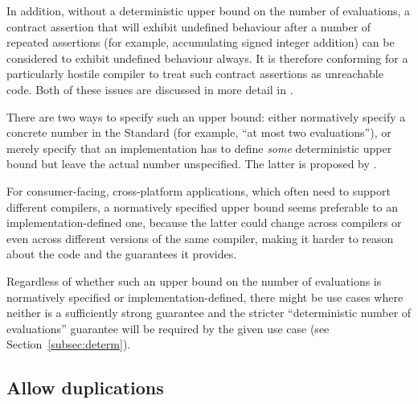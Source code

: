 In addition, without a deterministic upper bound on the number of evaluations, a contract assertion that will exhibit undefined behaviour after a number of repeated assertions (for example, accumulating signed integer addition) can be considered to exhibit undefined behaviour always. It is therefore conforming for a particularly hostile compiler to treat such contract assertions as unreachable code. Both of these issues are discussed in more detail in \cite{P3119R0}.

There are two ways to specify such an upper bound: either normatively specify a concrete number in the Standard (for example, ``at most two evaluations''), or merely specify that an implementation has to define \emph{some} deterministic upper bound but leave the actual number unspecified. The latter is proposed by \cite{P3119R0}.

For consumer-facing, cross-platform applications, which often need to support different compilers, a normatively specified upper bound seems preferable to an implementation-defined one, because the latter could change across compilers or even across different versions of the same compiler, making it harder to reason about the code and the guarantees it provides.

Regardless of whether such an upper bound on the number of evaluations is normatively specified or implementation-defined, there might be use cases where neither is a sufficiently strong guarantee and the stricter ``deterministic number of evaluations'' guarantee will be required by the given use case (see Section~\ref{subsec:determ}).

\subsection{Allow duplications}
\label{subsec:ville}

